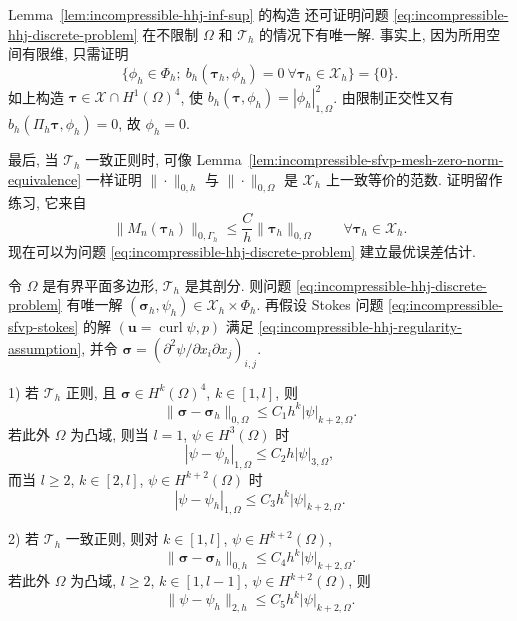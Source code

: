 \begin{Remark}\label{rem:incompressible-hhj-unconditional-uniqueness}
Lemma~\ref{lem:incompressible-hhj-inf-sup} 的构造
还可证明问题 \eqref{eq:incompressible-hhj-discrete-problem}
在不限制 $\Omega$ 和 $\mathcal T_h$ 的情况下有唯一解.
事实上, 因为所用空间有限维, 只需证明
\[
\{\phi_h\in\Phi_h;
\ b_h(\boldsymbol\tau_h,\phi_h)=0
\ \forall\boldsymbol\tau_h\in\mathcal X_h\}
=\{0\}.
\]
如上构造 $\boldsymbol\tau\in\mathcal X\cap H^1(\Omega)^4$, 使
$b_h(\boldsymbol\tau,\phi_h)=|\phi_h|_{1,\Omega}^2$.
由限制正交性又有
$b_h(\Pi_h\boldsymbol\tau,\phi_h)=0$, 故 $\phi_h=0$.
\end{Remark}

最后, 当 $\mathcal T_h$ 一致正则时,
可像 Lemma~\ref{lem:incompressible-sfvp-mesh-zero-norm-equivalence}
一样证明 $\|\cdot\|_{0,h}$ 与 $\|\cdot\|_{0,\Omega}$
是 $\mathcal X_h$ 上一致等价的范数.
证明留作练习, 它来自
\[
\|M_n(\boldsymbol\tau_h)\|_{0,\Gamma_h}
\leq\frac Ch\|\boldsymbol\tau_h\|_{0,\Omega}
\qquad\forall\boldsymbol\tau_h\in\mathcal X_h.
\]
现在可以为问题 \eqref{eq:incompressible-hhj-discrete-problem}
建立最优误差估计.

\begin{Theorem}\label{thm:incompressible-hhj-error}
令 $\Omega$ 是有界平面多边形,
$\mathcal T_h$ 是其剖分.
则问题 \eqref{eq:incompressible-hhj-discrete-problem}
有唯一解
$(\boldsymbol\sigma_h,\psi_h)\in\mathcal X_h\times\Phi_h$.
再假设 Stokes 问题 \eqref{eq:incompressible-sfvp-stokes}
的解 $(\mathbf u=\operatorname{curl}\psi,p)$
满足 \eqref{eq:incompressible-hhj-regularity-assumption}, 并令
$\boldsymbol\sigma=(\partial^2\psi/
\partial x_i\partial x_j)_{i,j}$.

\textup{1)} 若 $\mathcal T_h$ 正则, 且
$\boldsymbol\sigma\in H^k(\Omega)^4$, $k\in[1,l]$, 则
\begin{equation}\label{eq:incompressible-hhj-tensor-l2-error}
\|\boldsymbol\sigma-\boldsymbol\sigma_h\|_{0,\Omega}
\leq C_1h^k|\psi|_{k+2,\Omega}.
\end{equation}
若此外 $\Omega$ 为凸域, 则当 $l=1$, $\psi\in H^3(\Omega)$ 时
\begin{equation}\label{eq:incompressible-hhj-linear-h1-error}
|\psi-\psi_h|_{1,\Omega}
\leq C_2h|\psi|_{3,\Omega},
\end{equation}
而当 $l\geq2$, $k\in[2,l]$, $\psi\in H^{k+2}(\Omega)$ 时
\begin{equation}\label{eq:incompressible-hhj-h1-error}
|\psi-\psi_h|_{1,\Omega}
\leq C_3h^k|\psi|_{k+2,\Omega}.
\end{equation}

\textup{2)} 若 $\mathcal T_h$ 一致正则, 则对
$k\in[1,l]$, $\psi\in H^{k+2}(\Omega)$,
\begin{equation}\label{eq:incompressible-hhj-tensor-mesh-error}
\|\boldsymbol\sigma-\boldsymbol\sigma_h\|_{0,h}
\leq C_4h^k|\psi|_{k+2,\Omega}.
\end{equation}
若此外 $\Omega$ 为凸域, $l\geq2$,
$k\in[1,l-1]$, $\psi\in H^{k+2}(\Omega)$, 则
\begin{equation}\label{eq:incompressible-hhj-stream-mesh-error}
\|\psi-\psi_h\|_{2,h}
\leq C_5h^k|\psi|_{k+2,\Omega}.
\end{equation}
\end{Theorem}


